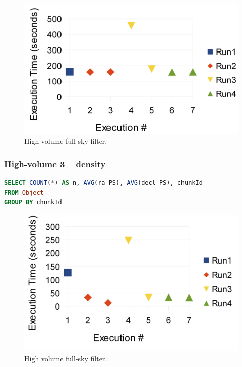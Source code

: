 \documentclass[DM,toc]{lsstdoc}
\begin{document}
\begin{figure}[H]
\centering
\includegraphics{_static/150_node_high_volume_full_sky}
\caption{High volume full-sky filter.}
\end{figure}

\subsubsection{High-volume 3 -- density}\label{high-volume-3-density}

\begin{lstlisting}[language=SQL]
SELECT COUNT(*) AS n, AVG(ra_PS), AVG(decl_PS), chunkId
FROM Object
GROUP BY chunkId
\end{lstlisting}

\begin{figure}[H]
\centering
\includegraphics{_static/150_node_high_volume_density}
\caption{High volume full-sky filter.}
\label{fig:150-node-high-volume-density}
\end{figure}
\end{document}

